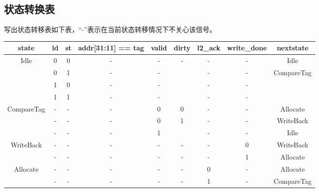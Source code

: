 \documentclass{../source/Experiment}
\begin{document}
        \subsection{状态转换表}
            写出状态转移表如下表，“-”表示在当前状态转移情况下不关心该信号。
            \begin{table}[H]
                \begin{tabular}{|c|c|c|c|c|c|c|c|c|}
                \hline
                state                       & ld & st & addr{[}31:11{]} == tag & valid & dirty & l2\_ack & write\_done & nextstate                   \\ \hline
                \multirow{4}{*}{Idle}       & 0  & 0  & -                      & -     & -     & -       & -           & Idle                        \\ \cline{2-9} 
                                            & 0  & 1  & -                      & -     &       & -       & -           & \multirow{3}{*}{CompareTag} \\ \cline{2-8}
                                            & 1  & 0  & -                      & -     &       & -       & -           &                             \\ \cline{2-8}
                                            & 1  & 1  & -                      & -     &       & -       & -           &                             \\ \hline
                \multirow{3}{*}{CompareTag} & -  & -  & -                      & 0     & 0     & -       & -           & Allocate                    \\ \cline{2-9} 
                                            & -  & -  & -                      & 0     & 1     & -       & -           & WriteBack                   \\ \cline{2-9} 
                                            & -  & -  & -                      & 1     &       & -       & -           & Idle                        \\ \hline
                \multirow{2}{*}{WriteBack}  & -  & -  & -                      & -     & -     & -       & 0           & WriteBack                   \\ \cline{2-9} 
                                            & -  & -  & -                      & -     & -     & -       & 1           & Allocate                    \\ \hline
                \multirow{2}{*}{Allocate}   & -  & -  & -                      & -     & -     & 0       & -           & Allocate                    \\ \cline{2-9} 
                                            & -  & -  & -                      & -     & -     & 1       & -           & CompareTag                  \\ \hline
                \end{tabular}
            \end{table}
\end{document}
